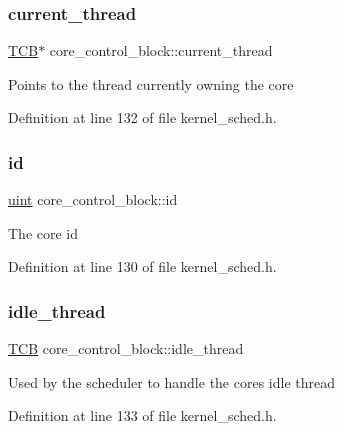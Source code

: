 \subsubsection{\texorpdfstring{current\+\_\+thread}{current\_thread}}
{\footnotesize\ttfamily \hyperlink{group__scheduler_gaf88d9c946bf70b36a1e8bc34383abfc9}{T\+CB}$\ast$ core\+\_\+control\+\_\+block\+::current\+\_\+thread}

Points to the thread currently owning the core 

Definition at line 132 of file kernel\+\_\+sched.\+h.

\mbox{\label{structcore__control__block_a5208867f309bdd1656fd473f38b30bfe}} 
\subsubsection{\texorpdfstring{id}{id}}
{\footnotesize\ttfamily \hyperlink{bios_8h_a91ad9478d81a7aaf2593e8d9c3d06a14}{uint} core\+\_\+control\+\_\+block\+::id}

The core id 

Definition at line 130 of file kernel\+\_\+sched.\+h.

\mbox{\label{structcore__control__block_a6dd29dab4a95ce740f45370345408c52}} 
\subsubsection{\texorpdfstring{idle\+\_\+thread}{idle\_thread}}
{\footnotesize\ttfamily \hyperlink{group__scheduler_gaf88d9c946bf70b36a1e8bc34383abfc9}{T\+CB} core\+\_\+control\+\_\+block\+::idle\+\_\+thread}

Used by the scheduler to handle the core\textquotesingle{}s idle thread 

Definition at line 133 of file kernel\+\_\+sched.\+h.

\mbox{\label{structcore__control__block_a858cde45d4478d73f60e839594b363f4}} 
